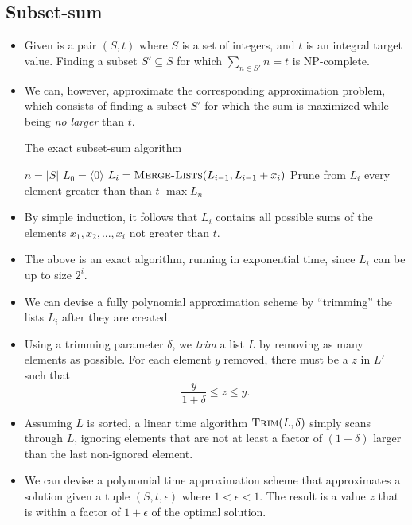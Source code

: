 \subsection{Subset-sum}

\begin{itemize}
\item Given is a pair $(S,t)$ where $S$ is a set of integers, and $t$
  is an integral target value. Finding a subset $S' \subseteq S$ for
  which $\sum_{n\in S'} n = t$ is NP-complete.
\item We can, however, approximate the corresponding approximation
  problem, which consists of finding a subset $S'$ for which the sum
  is maximized while being \emph{no larger} than $t$.
\begin{algorithm}
\caption{The exact subset-sum algorithm}
\begin{algorithmic}[1]
  \State $n = |S|$
  \State $L_0 = \langle 0 \rangle$
    \State $L_i = \textsc{Merge-Lists}(L_{i-1}, L_{i-1} + x_i)$
    \State Prune from $L_i$ every element greater than than $t$
  \EndFor
  \State \Return $\max L_n$
\EndProcedure
\end{algorithmic}
\end{algorithm}
\item By simple induction, it follows that $L_i$ contains all possible
  sums of the elements $x_1, x_2, ..., x_i$ not greater than $t$.
\item The above is an exact algorithm, running in exponential time,
  since $L_i$ can be up to size $2^i$.
\item We can devise a fully polynomial approximation scheme by
  ``trimming'' the lists $L_i$ after they are created.
\item Using a trimming parameter $\delta$, we \emph{trim} a list $L$
  by removing as many elements as possible. For each element $y$
  removed, there must be a $z$ in $L'$ such that $$\frac{y}{1+\delta}
  \leq z \leq y.$$
\item Assuming $L$ is sorted, a linear time algorithm
  $\textsc{Trim}(L,\delta)$ simply scans through $L$, ignoring
  elements that are not at least a factor of $(1+\delta)$ larger than
  the last non-ignored element.
\item We can devise a polynomial time approximation scheme that
  approximates a solution given a tuple $(S,t,\epsilon)$ where $1 <
  \epsilon < 1$. The result is a value $z$ that is within a factor of
  $1+\epsilon$ of the optimal solution.
\begin{algorithm}

\end{algorithm}
\end{itemize}
